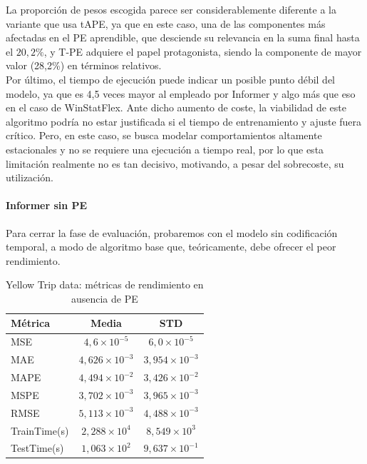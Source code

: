 La proporción de pesos escogida parece ser considerablemente diferente a la variante que usa tAPE, ya que en este caso, una de las componentes más afectadas en el PE aprendible, que desciende su relevancia en la suma final hasta el $20,2\%$, y T-PE adquiere el papel protagonista, siendo la componente de mayor valor (28,2\%) en términos relativos.\\

Por último, el tiempo de ejecución puede indicar un posible punto débil del modelo, ya que es 4,5 veces mayor al empleado por Informer y algo más que eso en el caso de WinStatFlex. Ante dicho aumento de coste, la viabilidad de este algoritmo podría no estar justificada si el tiempo de entrenamiento y ajuste fuera crítico. Pero, en este caso, se busca modelar comportamientos altamente estacionales y no se requiere una ejecución a tiempo real, por lo que esta limitación realmente no es tan decisivo, motivando, a pesar del sobrecoste, su utilización.

\paragraph{Informer sin PE}

Para cerrar la fase de evaluación, probaremos con el modelo sin codificación temporal, a modo de algoritmo base que, teóricamente, debe ofrecer el peor rendimiento.

\begin{table}[!ht]
	\centering
	\begin{tabular}{l|c|c}
		\toprule
		Métrica & Media & STD \\
		\midrule
		MSE & $4,6 \times 10^{-5}$ & $6,0 \times 10^{-5}$ \\
		MAE & $4,626 \times 10^{-3}$ & $3,954 \times 10^{-3}$ \\
		MAPE & $4,494 \times 10^{-2}$ & $3,426 \times 10^{-2}$ \\
		MSPE & $3,702 \times 10^{-3}$ & $3,965 \times 10^{-3}$ \\
		RMSE & $5,113 \times 10^{-3}$ & $4,488 \times 10^{-3}$ \\
		TrainTime(s) & $2,288 \times 10^{4}$ & $8,549 \times 10^{3}$ \\
		TestTime(s) & $1,063 \times 10^{2}$ & $9,637 \times 10^{-1}$ \\
		\bottomrule
	\end{tabular}
	\caption{Yellow Trip data: métricas de rendimiento en ausencia de PE}
	\label{taxinope}
\end{table}

